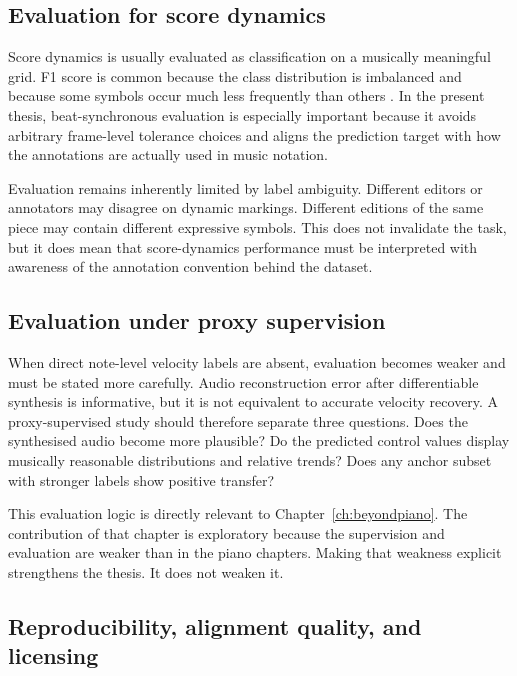 \subsection{Evaluation for score dynamics}
\label{sec:bg:dataeval:scoredyn}

Score dynamics is usually evaluated as classification on a musically meaningful grid. F1 score is common because the class distribution is imbalanced and because some symbols occur much less frequently than others \cite{kosta2017thesis}. In the present thesis, beat-synchronous evaluation is especially important because it avoids arbitrary frame-level tolerance choices and aligns the prediction target with how the annotations are actually used in music notation.

Evaluation remains inherently limited by label ambiguity. Different editors or annotators may disagree on dynamic markings. Different editions of the same piece may contain different expressive symbols. This does not invalidate the task, but it does mean that score-dynamics performance must be interpreted with awareness of the annotation convention behind the dataset.

\subsection{Evaluation under proxy supervision}
\label{sec:bg:dataeval:proxy}

When direct note-level velocity labels are absent, evaluation becomes weaker and must be stated more carefully. Audio reconstruction error after differentiable synthesis is informative, but it is not equivalent to accurate velocity recovery. A proxy-supervised study should therefore separate three questions. Does the synthesised audio become more plausible? Do the predicted control values display musically reasonable distributions and relative trends? Does any anchor subset with stronger labels show positive transfer?

This evaluation logic is directly relevant to Chapter~\ref{ch:beyondpiano}. The contribution of that chapter is exploratory because the supervision and evaluation are weaker than in the piano chapters. Making that weakness explicit strengthens the thesis. It does not weaken it.

\subsection{Reproducibility, alignment quality, and licensing}
\label{sec:bg:dataeval:repro}

